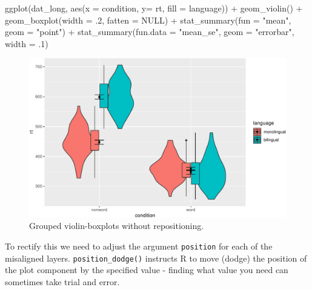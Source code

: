 \documentclass[
  english,
  doc,floatsintext]{apa6}
\newenvironment{Shaded}{\begin{snugshade}}{\end{snugshade}}
\newcommand{\AttributeTok}[1]{\textcolor[rgb]{0.77,0.63,0.00}{#1}}
\newcommand{\ConstantTok}[1]{\textcolor[rgb]{0.00,0.00,0.00}{#1}}
\newcommand{\DecValTok}[1]{\textcolor[rgb]{0.00,0.00,0.81}{#1}}
\newcommand{\FunctionTok}[1]{\textcolor[rgb]{0.00,0.00,0.00}{#1}}
\newcommand{\NormalTok}[1]{#1}
\newcommand{\SpecialCharTok}[1]{\textcolor[rgb]{0.00,0.00,0.00}{#1}}
\newcommand{\StringTok}[1]{\textcolor[rgb]{0.31,0.60,0.02}{#1}}
\begin{document}
\begin{Shaded}
\begin{Highlighting}[]
\FunctionTok{ggplot}\NormalTok{(dat\_long, }\FunctionTok{aes}\NormalTok{(}\AttributeTok{x =}\NormalTok{ condition, }\AttributeTok{y=}\NormalTok{ rt, }\AttributeTok{fill =}\NormalTok{ language)) }\SpecialCharTok{+}
  \FunctionTok{geom\_violin}\NormalTok{() }\SpecialCharTok{+}
  \FunctionTok{geom\_boxplot}\NormalTok{(}\AttributeTok{width =}\NormalTok{ .}\DecValTok{2}\NormalTok{, }\AttributeTok{fatten =} \ConstantTok{NULL}\NormalTok{) }\SpecialCharTok{+}
  \FunctionTok{stat\_summary}\NormalTok{(}\AttributeTok{fun =} \StringTok{"mean"}\NormalTok{, }\AttributeTok{geom =} \StringTok{"point"}\NormalTok{) }\SpecialCharTok{+}
  \FunctionTok{stat\_summary}\NormalTok{(}\AttributeTok{fun.data =} \StringTok{"mean\_se"}\NormalTok{, }\AttributeTok{geom =} \StringTok{"errorbar"}\NormalTok{, }\AttributeTok{width =}\NormalTok{ .}\DecValTok{1}\NormalTok{)}
\end{Highlighting}
\end{Shaded}

\begin{figure}

{\centering \includegraphics[width=1\linewidth]{images/viobox2-1} 

}

\caption{Grouped violin-boxplots without repositioning.}\label{fig:viobox2}
\end{figure}

To rectify this we need to adjust the argument \texttt{position} for each of the misaligned layers. \texttt{position\_dodge()} instructs R to move (dodge) the position of the plot component by the specified value - finding what value you need can sometimes take trial and error.
\end{document}
